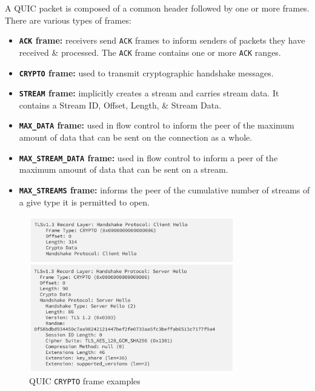 \documentclass[a4paper,11pt]{article}
\begin{document}
A QUIC packet is composed of a common header followed by one or more frames.
There are various types of frames:
\begin{itemize}
    \item   \textbf{\texttt{ACK} frame:} receivers send \verb|ACK| frames to inform senders of packets they have received \& processed.
            The \verb|ACK| frame contains one or more \verb|ACK| ranges.

    \item   \textbf{\texttt{CRYPTO} frame:} used to transmit cryptographic handshake messages.

    \item   \textbf{\texttt{STREAM} frame:} implicitly creates a stream and carries stream data.
            It contains a Stream ID, Offset, Length, \& Stream Data.

    \item   \textbf{\texttt{MAX\_DATA} frame:} used in flow control to inform the peer of the maximum amount of data that can be sent on the connection as a whole.

    \item   \textbf{\texttt{MAX\_STREAM\_DATA} frame:} used in flow control to inform a peer of the maximum amount of data that can be sent on a stream.

    \item   \textbf{\texttt{MAX\_STREAMS} frame:} informs the peer of the cumulative number of streams of a give type it is permitted to open.
\end{itemize}

\begin{figure}[H]
    \centering
    \includegraphics[width=0.8\textwidth]{./images/quicframes.png}
    \caption{QUIC \texttt{CRYPTO} frame examples}
\end{figure}
\end{document}
